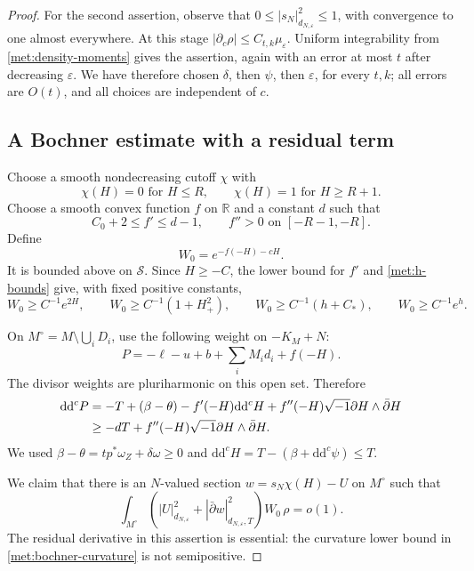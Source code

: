 \documentclass[11pt,letterpaper]{article}
\newcommand{\R}{\mathbb{R}}
\newcommand{\ii}{\sqrt{-1}}
\newcommand{\ddc}{\mathrm{d}\mathrm{d}^{c}}
\theoremstyle{definition}
\theoremstyle{remark}
\begin{document}
\begin{proof}
For the second assertion, observe that
\(0\leq|s_N|_{d_{N,\varepsilon}}^2\leq1\), with convergence to one
almost everywhere.  At this stage
\(|\partial_c\rho|\leq C_{t,k}\mu_\varepsilon\).
Uniform integrability from \eqref{met:density-moments} gives the
assertion, again with an error at most \(t\) after decreasing
\(\varepsilon\).  We have therefore chosen \(\delta\), then
\(\psi\), then \(\varepsilon\), for every \(t,k\); all errors are
\(O(t)\), and all choices are independent of \(c\).

\subsection*{A Bochner estimate with a residual term}

Choose a smooth nondecreasing cutoff \(\chi\) with
\[
 \chi(H)=0\text{ for }H\leq R,
 \qquad \chi(H)=1\text{ for }H\geq R+1.
\]
Choose a smooth convex function \(f\) on \(\R\) and a constant \(d\)
such that
\[
 C_0+2\leq f'\leq d-1,
 \qquad f''>0\text{ on }[-R-1,-R].
\]
Define
\begin{equation}
 \label{met:transport-weight}
 W_0=e^{-f(-H)-cH}.
\end{equation}
It is bounded above on \(\mathcal S\).  Since \(H\geq-C\), the lower
bound for \(f'\) and \eqref{met:h-bounds} give, with fixed positive
constants,
\begin{equation}
 \label{met:weight-domination}
 W_0\geq C^{-1}e^{2H},
 \qquad
 W_0\geq C^{-1}(1+H_+^2),
 \qquad
 W_0\geq C^{-1}(h+C_*),
 \qquad
 W_0\geq C^{-1}e^h.
\end{equation}

On \(M^\circ=M\setminus\bigcup_iD_i\), use the following weight on
\(-K_M+N\):
\begin{equation}
 \label{met:bochner-weight}
 P=-\ell-u+b+\sum_iM_i d_i+f(-H).
\end{equation}
The divisor weights are pluriharmonic on this open set.  Therefore
\begin{align}
 \label{met:bochner-curvature}
 \ddc P
 &=-T+(\beta-\theta)-f'(-H)\ddc H
       +f''(-H)\ii\partial H\wedge\bar\partial H\notag\\
 &\geq-dT+f''(-H)\ii\partial H\wedge\bar\partial H.
\end{align}
We used \(\beta-\theta=t p^*\omega_Z+\delta\omega\geq0\) and
\(\ddc H=T-(\beta+\ddc\psi)\leq T\).

We claim that there is an \(N\)-valued section
\(w=s_N\chi(H)-U\) on \(M^\circ\) such that
\begin{equation}
 \label{met:bochner-result}
 \int_{M^\circ}
 \left(|U|_{d_{N,\varepsilon}}^2
       +|\bar\partial w|_{d_{N,\varepsilon},T}^2\right)
 W_0\,\rho=o(1).
\end{equation}
The residual derivative in this assertion is essential: the curvature
lower bound in \eqref{met:bochner-curvature} is not semipositive.


\end{proof}
\end{document}
